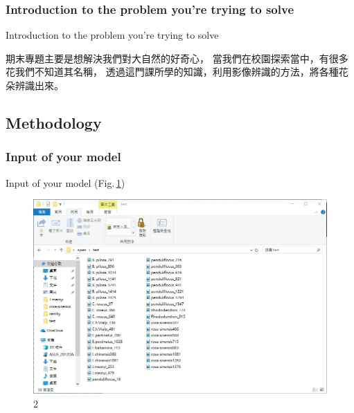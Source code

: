 \documentclass{beamer}
\begin{document}
\subsubsection{Introduction to the problem you're trying to solve \medskip}
\begin{frame}{Introduction to the problem you're trying to solve}
  \begin{CJK}{UTF8}{bkai}
      \begin{spacing}{1.5}\qquad
	期末專題主要是想解決我們對大自然的好奇心，
	當我們在校園探索當中，有很多花我們不知道其名稱，
	透過這門課所學的知識，利用影像辨識的方法，將各種花朵辨識出來。
	\end{spacing}
  \end{CJK}
\end{frame}

\subsection{Methodology}
\subsubsection{ Input of your model }
\begin{frame}{Input of your model }
  (Fig.\,\ref{fig:2})
    \begin{figure}
    \includegraphics[width=0.7\linewidth]{input.jpg}
    \caption{2}
    \label{fig:2}
  \end{figure}
\end{frame}
\end{document}
